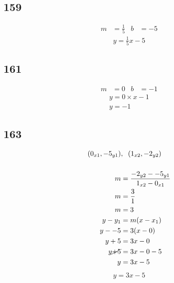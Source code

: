 \documentclass{article}
\begin{document}
    \subsection*{159}
    \begin{align*}
        m &= \frac{1}{5} &b &=-5
    \end{align*}
    \begin{align*}
        \boxed{y = \frac{1}{5}x - 5}
    \end{align*}

    \subsection*{161}
    \begin{align*}
        m &= 0 &b &=-1
    \end{align*}
    \begin{align*}
        y = 0 \times x -1\\
        \boxed{y = -1}
    \end{align*}

    \subsection*{163}
    \begin{align*}
        (0_{x1}, -5_{y1})&,\hspace{.2cm} (1_{x2}, -2_{y2}) \\
        \\
        m &= \frac{-2_{y2} -  -5_{y1}}{1_{x2} - 0_{x1}} \\
        m &= \frac{3}{1} \\
        m &= 3\\
        y - y_{1} &= m(x - x_{1})\\
        y - -5 &= 3(x - 0) \\
        y +5 &= 3x - 0\\
        y \cancel{+5} &= 3x - 0 - 5\\
        y &= 3x -5
    \end{align*}
    \begin{align*}
        \boxed{y = 3x -5}
    \end{align*}
\end{document}
